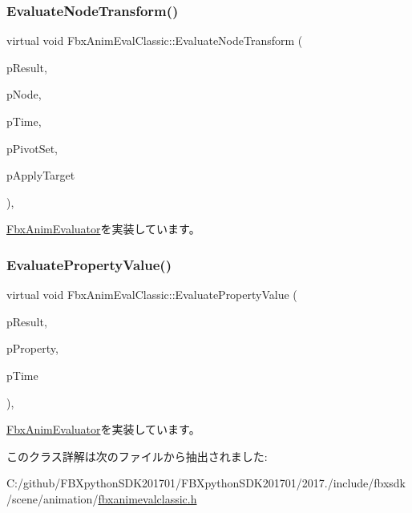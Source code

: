 \subsubsection{\texorpdfstring{Evaluate\+Node\+Transform()}{EvaluateNodeTransform()}}
{\footnotesize\ttfamily virtual void Fbx\+Anim\+Eval\+Classic\+::\+Evaluate\+Node\+Transform (\begin{DoxyParamCaption}\item[{\hyperlink{class_fbx_node_eval_state}{Fbx\+Node\+Eval\+State} $\ast$}]{p\+Result,  }\item[{\hyperlink{class_fbx_node}{Fbx\+Node} $\ast$}]{p\+Node,  }\item[{const \hyperlink{class_fbx_time}{Fbx\+Time} \&}]{p\+Time,  }\item[{\hyperlink{class_fbx_node_ae62b7311ac4727654cdf1ebd5cbf7343}{Fbx\+Node\+::\+E\+Pivot\+Set}}]{p\+Pivot\+Set,  }\item[{bool}]{p\+Apply\+Target }\end{DoxyParamCaption})\hspace{0.3cm}{\ttfamily [protected]}, {\ttfamily [virtual]}}



\hyperlink{class_fbx_anim_evaluator_a6de6ef5ab77169192cd39baf76f14037}{Fbx\+Anim\+Evaluator}を実装しています。

\mbox{\label{class_fbx_anim_eval_classic_a3618b50c5fd35f18f5e6f873ca07cf2e}} 
\subsubsection{\texorpdfstring{Evaluate\+Property\+Value()}{EvaluatePropertyValue()}}
{\footnotesize\ttfamily virtual void Fbx\+Anim\+Eval\+Classic\+::\+Evaluate\+Property\+Value (\begin{DoxyParamCaption}\item[{\hyperlink{class_fbx_property_eval_state}{Fbx\+Property\+Eval\+State} $\ast$}]{p\+Result,  }\item[{\hyperlink{class_fbx_property}{Fbx\+Property} \&}]{p\+Property,  }\item[{const \hyperlink{class_fbx_time}{Fbx\+Time} \&}]{p\+Time }\end{DoxyParamCaption})\hspace{0.3cm}{\ttfamily [protected]}, {\ttfamily [virtual]}}



\hyperlink{class_fbx_anim_evaluator_aa29759ee76b1cbb0ced4fee1508d5d84}{Fbx\+Anim\+Evaluator}を実装しています。



このクラス詳解は次のファイルから抽出されました\+:\begin{DoxyCompactItemize}
\item 
C\+:/github/\+F\+B\+Xpython\+S\+D\+K201701/\+F\+B\+Xpython\+S\+D\+K201701/2017./include/fbxsdk/scene/animation/\hyperlink{fbxanimevalclassic_8h}{fbxanimevalclassic.\+h}\end{DoxyCompactItemize}
